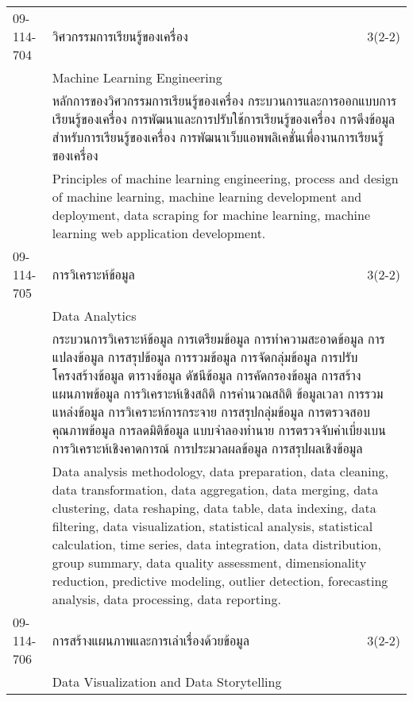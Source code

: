 \begin{longtable}{p{}p{}r{}}
09-114-704 & วิศวกรรมการเรียนรู้ของเครื่อง & 3(2-2)\\*
 & Machine Learning Engineering & \phantom{x} \vspace{3mm} \\*
&  \multicolumn{2}{p{0.75\textwidth}}{หลักการของวิศวกรรมการเรียนรู้ของเครื่อง กระบวนการและการออกแบบการเรียนรู้ของเครื่อง การพัฒนาและการปรับใช้การเรียนรู้ของเครื่อง การดึงข้อมูลสำหรับการเรียนรู้ของเครื่อง การพัฒนาเว็บแอพพลิเคชั่นเพื่องานการเรียนรู้ของเครื่อง } \vspace{3mm} \\*
&  \multicolumn{2}{p{0.75\textwidth}}{Principles of machine learning engineering, process and design of machine learning, machine learning development and deployment, data scraping for machine learning, machine learning web application development.} \vspace{8mm} \\*
09-114-705 & การวิเคราะห์ข้อมูล & 3(2-2)\\*
 & Data Analytics & \phantom{x} \vspace{3mm} \\*
&  \multicolumn{2}{p{0.75\textwidth}}{กระบวนการวิเคราะห์ข้อมูล การเตรียมข้อมูล การทำความสะอาดข้อมูล การแปลงข้อมูล การสรุปข้อมูล การรวมข้อมูล การจัดกลุ่มข้อมูล การปรับโครงสร้างข้อมูล ตารางข้อมูล ดัชนีข้อมูล การคัดกรองข้อมูล การสร้างแผนภาพข้อมูล การวิเคราะห์เชิงสถิติ การคำนวณสถิติ ข้อมูลเวลา การรวมแหล่งข้อมูล การวิเคราะห์การกระจาย การสรุปกลุ่มข้อมูล การตรวจสอบคุณภาพข้อมูล การลดมิติข้อมูล แบบจำลองทำนาย การตรวจจับค่าเบี่ยงเบน การวิเคราะห์เชิงคาดการณ์ การประมวลผลข้อมูล การสรุปผลเชิงข้อมูล} \vspace{3mm} \\*
&  \multicolumn{2}{p{0.75\textwidth}}{Data analysis methodology, data preparation, data cleaning, data transformation, data aggregation, data merging, data clustering, data reshaping, data table, data indexing, data filtering, data visualization, statistical analysis, statistical calculation, time series, data integration, data distribution, group summary, data quality assessment, dimensionality reduction, predictive modeling, outlier detection, forecasting analysis, data processing, data reporting.} \vspace{8mm} \\*
09-114-706 & การสร้างแผนภาพและการเล่าเรื่องด้วยข้อมูล & 3(2-2)\\*
 & Data Visualization and Data Storytelling & \phantom{x} \vspace{3mm} \\*

\end{longtable}
